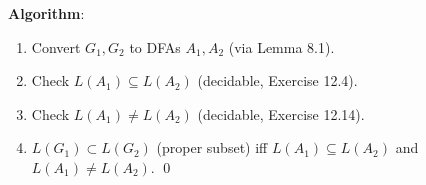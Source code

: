 \begin{enumerate}[{12.}1. ]
\textbf{Algorithm}:
\begin{enumerate}
\item Convert $G_1, G_2$ to DFAs $A_1, A_2$ (via Lemma 8.1).
\item Check $L(A_1)\subseteq L(A_2)$ (decidable, Exercise 12.4).
\item Check $L(A_1)\neq L(A_2)$ (decidable, Exercise 12.14).
\item $L(G_1)\subset L(G_2)$ (proper subset) iff $L(A_1)\subseteq L(A_2)$ and $L(A_1)\neq L(A_2)$. \qed
\end{enumerate}

\end{enumerate}
